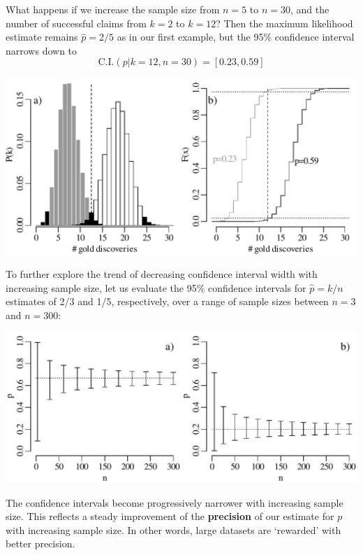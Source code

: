 What happens if we increase the sample size from $n=5$ to $n=30$, and
the number of successful claims from $k=2$ to $k=12$?  Then the
maximum likelihood estimate remains $\hat{p}=2/5$ as in our first
example, but the 95\% confidence interval narrows down to
\[
\mbox{C.I.}(p|k=12,n=30) = [0.23, 0.59]
\]

\noindent\begin{minipage}[t][][b]{.65\textwidth}
\includegraphics[width=\textwidth]{../figures/binomcik12n30.pdf}
\medskip
\end{minipage}
\begin{minipage}[t][][t]{.35\textwidth}
  \label{fig:binomcik12n30}
\end{minipage}

To further explore the trend of decreasing confidence interval width
with increasing sample size, let us evaluate the 95\% confidence
intervals for $\hat{p}=k/n$ estimates of 2/3 and 1/5, respectively,
over a range of sample sizes between $n=3$ and $n=300$:\medskip

\noindent\begin{minipage}[t][][b]{.65\textwidth}
\includegraphics[width=\textwidth]{../figures/binomcivsn.pdf}
\medskip
\end{minipage}
\begin{minipage}[t][][t]{.35\textwidth}
  \label{fig:binomcivsn}
\end{minipage}

The confidence intervals become progressively narrower with increasing
sample size. This reflects a steady improvement of the
\textbf{precision} of our estimate for $p$ with increasing sample
size. In other words, large datasets are `rewarded' with better
precision.
